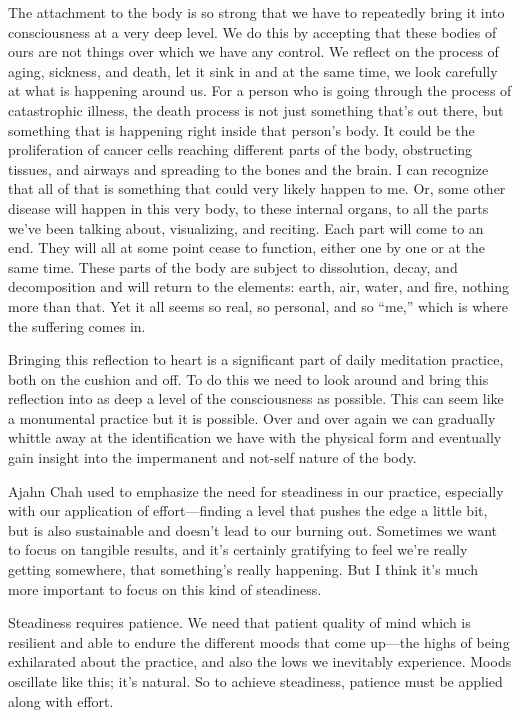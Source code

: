The attachment to the body is so strong that we have to repeatedly 
bring it into consciousness at a very deep level. We do this by 
accepting that these bodies of ours are not things over which we have 
any control. We reflect on the process of aging, sickness, and death, 
let it sink in and at the same time, we look carefully at what is 
happening around us. For a person who is going through the process of 
catastrophic illness, the death process is not just something that's 
out there, but something that is happening right inside that person's 
body. It could be the proliferation of cancer cells reaching different 
parts of the body, obstructing tissues, and airways and spreading to 
the bones and the brain. I can recognize that all of that is something 
that could very likely happen to me. Or, some other disease will happen 
in this very body, to these internal organs, to all the parts we've 
been talking about, visualizing, and reciting. Each part will come to 
an end. They will all at some point cease to function, either one by 
one or at the same time. These parts of the body are subject to 
dissolution, decay, and decomposition and will return to the elements: 
earth, air, water, and fire, nothing more than that. Yet it all seems 
so real, so personal, and so ``me,'' which is where the suffering comes 
in.

Bringing this reflection to heart is a significant part of daily 
meditation practice, both on the cushion and off. To do this we need to 
look around and bring this reflection into as deep a level of the 
consciousness as possible. This can seem like a monumental practice but 
it is possible. Over and over again we can gradually whittle away at 
the identification we have with the physical form and eventually gain 
insight into the impermanent and not-self nature of the body.


Ajahn Chah used to emphasize the need for steadiness in our practice, 
especially with our application of effort---finding a level that pushes 
the edge a little bit, but is also sustainable and doesn't lead to our 
burning out. Sometimes we want to focus on tangible results, and it's 
certainly gratifying to feel we're really getting somewhere, that 
something's really happening. But I think it's much more important to 
focus on this kind of steadiness.

Steadiness requires patience. We need that patient quality of mind 
which is resilient and able to endure the different moods that come 
up---the highs of being exhilarated about the practice, and also the 
lows we inevitably experience. Moods oscillate like this; it's natural. 
So to achieve steadiness, patience must be applied along with effort.

